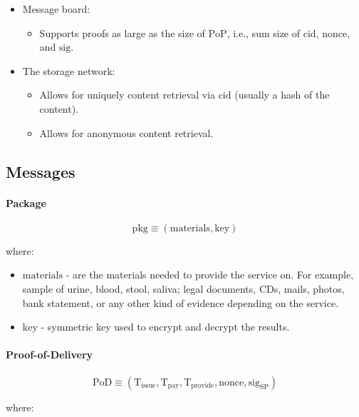 \documentclass{ieeeaccess}
\begin{document}
\begin{itemize}
\item Message board:
    \begin{itemize}
        \item Supports proofs as large as the size of $\mathrm{PoP}$, i.e., sum size of $\mathrm{cid}$, $\mathrm{nonce}$, and $\mathrm{sig}$.
    \end{itemize}

\item The storage network:
    \begin{itemize}
        \item Allows for uniquely content retrieval via $\mathrm{cid}$ (usually a hash of the content).
        \item Allows for anonymous content retrieval.
    \end{itemize}
\end{itemize}

\subsection{Messages}\label{messages}

\paragraph{Package}\label{package}

$$\mathrm{pkg} \equiv (\mathrm{materials}, \mathrm{key})$$

where:

\begin{itemize}

\item $\mathrm{materials}$ - are the materials needed to provide the service on. For example, sample of urine, blood, stool, saliva; legal documents, CDs, mails, photos, bank statement, or any other kind of evidence depending on the service.
\item $\mathrm{key}$ - symmetric key used to encrypt and decrypt the results.
\end{itemize}

\paragraph{Proof-of-Delivery}\label{proof-of-delivery}

$$\mathrm{PoD} \equiv (\mathrm{T}_\mathrm{issue}, \mathrm{T}_\mathrm{pay}, \mathrm{T}_\mathrm{provide}, \mathrm{nonce}, \mathrm{sig}_\mathrm{SP})$$

where:
\end{document}
